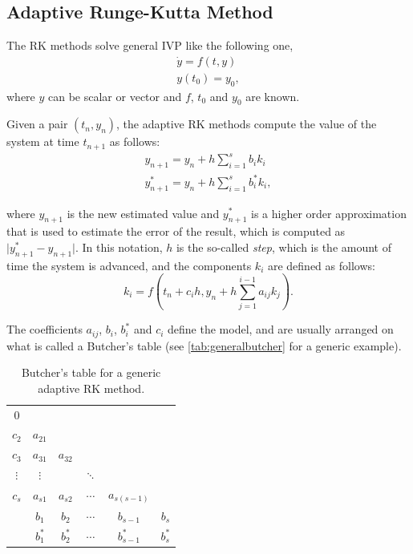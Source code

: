 \subsection{Adaptive Runge-Kutta Method}

The \ac{RK} methods solve general \ac{IVP} like the following one,
\begin{align*}
	\dot{y} = f(t,y) \\
	y(t_0) = y_0,
\end{align*}
where $y$ can be scalar or vector and $f$, $t_0$ and $y_0$ are known.

Given a pair $(t_n, y_n)$, the adaptive \ac{RK} methods compute the value of the system at time $t_{n+1}$ as follows:
\begin{align*}
	y_{n+1} = y_n + h \sum_{i=1}^s b_i k_i\\
	y^*_{n+1} = y_n + h \sum_{i=1}^s b^*_i k_i,
\end{align*}

where $y_{n+1}$ is the new estimated value and $y^*_{n+1}$ is a higher order approximation that is used to estimate the error of the result, which is computed as $\vert y^*_{n+1} - y_{n+1} \vert$. In this notation, $h$ is the so-called \emph{step}, which is the amount of time the system is advanced, and the components $k_i$ are defined as follows:
\[
	k_i = f(t_n + c_ih, y_n + h\sum_{j=1}^{i-1} a_{ij} k_j).
\]

The coefficients $a_{ij}$, $b_i$, $b_i^*$ and $c_i$ define the model, and are usually arranged on what is called a Butcher's table (see \autoref{tab:generalbutcher} for a generic example).

\begin{table}[bth]
	\myfloatalign
	\begin{tabularx}{.54\textwidth}{c|ccccc}
		$0$&  & & & & \\
		$c_2$& $a_{21}$ & & & & \\
		$c_3$& $a_{31}$ & $a_{32}$ & & & \\
		$\vdots$& $\vdots$ &  & $\ddots$ & & \\
		$c_s$& $a_{s1}$  & $a_{s2}$ & $\cdots$ & $a_{s(s-1)}$ & \\ \hline
		& $b_1$ & $b_2$ & $\cdots$ & $b_{s-1}$ & $b_s$ \\ \hline
		& $b^*_1$ & $b^*_2$ & $\cdots$ & $b^*_{s-1}$ & $b^*_s$ \\
	\end{tabularx}
	\caption[Butcher's table for an adaptive RK method]{Butcher's table for a generic adaptive \ac{RK} method.}
	\label{tab:generalbutcher}
\end{table}

